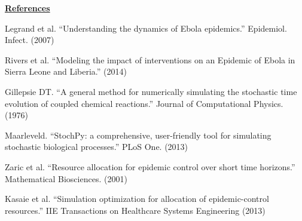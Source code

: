 \documentclass[11pt,letter]{article}
\begin{document}
\underline{\textbf{References}}\vspace{0.5mm}
\begin{enumerate}[ {[}1{]} ]
\item{Legrand et al. ``Understanding the dynamics of Ebola epidemics.'' Epidemiol. Infect. (2007)}
\item{Rivers et al. ``Modeling the impact of interventions on an Epidemic of Ebola in Sierra Leone and Liberia.'' (2014)}
\item{Gillepsie DT. ``A general method for numerically simulating the stochastic time evolution of coupled chemical reactions.'' Journal of Computational Physics. (1976)}
\item{Maarleveld. ``StochPy: a comprehensive, user-friendly tool for simulating stochastic biological processes.'' PLoS One. (2013)}
\item{Zaric et al. ``Resource allocation for epidemic control over short time horizons.'' Mathematical Biosciences. (2001)}
\item{Kasaie et al. ``Simulation optimization for allocation of epidemic-control resources.'' IIE Transactions on Healthcare Systems Engineering (2013)}
\end{enumerate}
\end{document}
